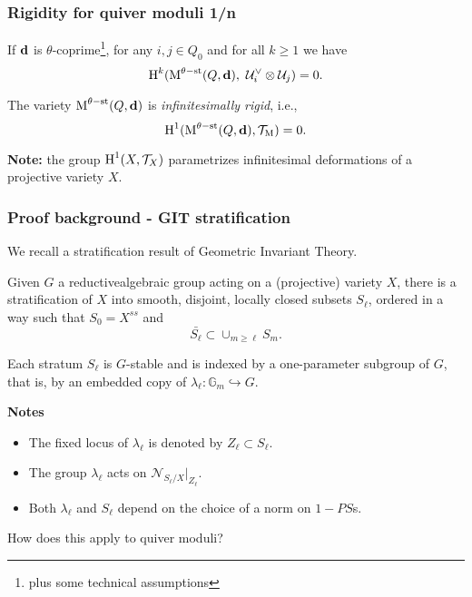 \documentclass{beamer}
\begin{document}
\begin{frame}
    \frametitle{Rigidity for quiver moduli 1/n}
\begin{theorem}
If $\mathbf{d}$ is $\theta$-coprime\footnote{ plus some technical assumptions}, for any $i, j \in Q_0$ and for all $k \geq 1$ we have
\[\operatorname{H}^{k}(\operatorname{M}^{\theta-\mathrm{st}}(Q, \mathbf{d}),~\mathcal{U}^{\vee}_{i} \otimes \mathcal{U}_j) = 0. \]
\end{theorem} \pause
\begin{corollary}
The variety $\operatorname{M}^{\theta-\mathrm{st}}(Q, \mathbf{d})$ is \emph{infinitesimally rigid}, i.e.,
\[ \operatorname{H}^1(\operatorname{M}^{\theta-\mathrm{st}}(Q, \mathbf{d}), \mathcal{T}_{\operatorname{M}}) = 0. \]
\end{corollary} \pause

{\bf Note:} the group $\operatorname{H}^1(X, \mathcal{T}_{X})$ parametrizes infinitesimal
deformations of a projective variety $X$.
\end{frame}

\begin{frame}
    \frametitle{Proof background - GIT stratification}
We recall a stratification result of Geometric Invariant Theory. \pause
\begin{theorem}
Given $G$ a reductivealgebraic group
acting on a (projective) variety $X$,
there is a stratification of $X$
into smooth, disjoint, locally closed subsets $S_{\ell}$,
ordered in a way such that $S_0 = X^{ss}$ and
\[\bar{S_{\ell}} \subset \cup_{m \geq \ell} S_m.\]
\end{theorem} \pause

Each stratum $S_{\ell}$ is $G$-stable and is indexed by
a one-parameter subgroup of $G$,
that is, by an embedded copy of
$\lambda_{\ell} \colon \mathbb{G}_m \hookrightarrow G$. \pause

{\bf Notes} \pause
\begin{itemize}
    \item The fixed locus of $\lambda_{\ell}$ is denoted by $Z_{\ell} \subset S_{\ell}$. \pause
    \item The group $\lambda_{\ell}$ acts on $\mathcal{N}_{S_{\ell}/X}|_{Z_{\ell}}$. \pause
    \item Both $\lambda_{\ell}$ and $S_{\ell}$ depend on the choice of a norm on $1-PS$s.
\end{itemize} \pause
How does this apply to quiver moduli?
\end{frame}
\end{document}
